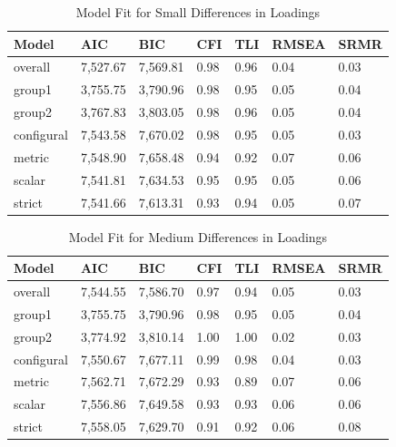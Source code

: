 \documentclass[
  man]{apa6}
\begin{document}
\begin{table}[tbp]

\begin{center}
\begin{threeparttable}

\caption{\label{tab:unnamed-chunk-2}Model Fit for Small Differences in Loadings}

\begin{tabular}{lllllll}
\toprule
Model & AIC & BIC & CFI & TLI & RMSEA & SRMR\\
\midrule
overall & 7,527.67 & 7,569.81 & 0.98 & 0.96 & 0.04 & 0.03\\
group1 & 3,755.75 & 3,790.96 & 0.98 & 0.95 & 0.05 & 0.04\\
group2 & 3,767.83 & 3,803.05 & 0.98 & 0.96 & 0.05 & 0.04\\
configural & 7,543.58 & 7,670.02 & 0.98 & 0.95 & 0.05 & 0.03\\
metric & 7,548.90 & 7,658.48 & 0.94 & 0.92 & 0.07 & 0.06\\
scalar & 7,541.81 & 7,634.53 & 0.95 & 0.95 & 0.05 & 0.06\\
strict & 7,541.66 & 7,613.31 & 0.93 & 0.94 & 0.05 & 0.07\\
\bottomrule
\end{tabular}

\end{threeparttable}
\end{center}

\end{table}

\begin{table}[tbp]

\begin{center}
\begin{threeparttable}

\caption{\label{tab:unnamed-chunk-3}Model Fit for Medium Differences in Loadings}

\begin{tabular}{lllllll}
\toprule
Model & AIC & BIC & CFI & TLI & RMSEA & SRMR\\
\midrule
overall & 7,544.55 & 7,586.70 & 0.97 & 0.94 & 0.05 & 0.03\\
group1 & 3,755.75 & 3,790.96 & 0.98 & 0.95 & 0.05 & 0.04\\
group2 & 3,774.92 & 3,810.14 & 1.00 & 1.00 & 0.02 & 0.03\\
configural & 7,550.67 & 7,677.11 & 0.99 & 0.98 & 0.04 & 0.03\\
metric & 7,562.71 & 7,672.29 & 0.93 & 0.89 & 0.07 & 0.06\\
scalar & 7,556.86 & 7,649.58 & 0.93 & 0.93 & 0.06 & 0.06\\
strict & 7,558.05 & 7,629.70 & 0.91 & 0.92 & 0.06 & 0.08\\
\bottomrule
\end{tabular}

\end{threeparttable}
\end{center}

\end{table}
\end{document}
